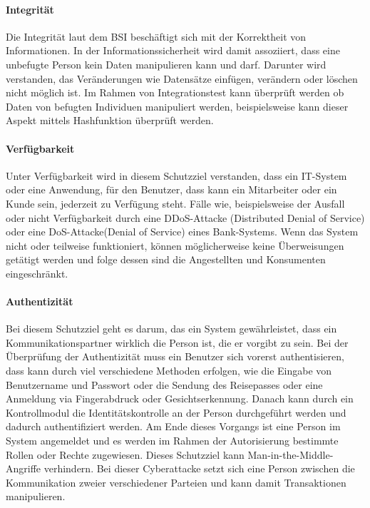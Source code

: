 \paragraph{Integrität}
Die Integrität laut dem BSI beschäftigt sich mit der Korrektheit von Informationen. In der Informationssicherheit wird damit assoziiert, dass eine unbefugte Person kein Daten manipulieren kann und darf. Darunter wird verstanden, das Veränderungen wie Datensätze einfügen, verändern oder löschen nicht möglich ist.
Im Rahmen von Integrationstest kann überprüft werden ob Daten von befugten Individuen manipuliert werden, beispielsweise kann dieser Aspekt mittels Hashfunktion überprüft werden.


\paragraph{Verfügbarkeit}
Unter Verfügbarkeit wird in diesem Schutzziel verstanden, dass ein IT-System oder eine Anwendung, für den Benutzer, dass kann ein Mitarbeiter oder ein Kunde sein, jederzeit zu Verfügung steht. Fälle wie, beispielsweise der Ausfall oder nicht Verfügbarkeit durch eine DDoS-Attacke  (Distributed Denial of Service) oder eine DoS-Attacke(Denial of Service) eines Bank-Systems. Wenn das System nicht oder teilweise funktioniert, können möglicherweise keine Überweisungen getätigt werden und folge dessen sind die Angestellten und Konsumenten eingeschränkt. 

\paragraph{Authentizität}
Bei diesem Schutzziel geht es darum, das ein System gewährleistet, dass ein Kommunikationspartner wirklich die Person ist, die er vorgibt zu sein. Bei der Überprüfung der Authentizität muss ein Benutzer sich vorerst authentisieren, dass kann durch viel verschiedene Methoden erfolgen, wie die Eingabe von Benutzername und Passwort oder die Sendung des Reisepasses oder eine Anmeldung via Fingerabdruck oder Gesichtserkennung. Danach kann durch ein Kontrollmodul die Identitätskontrolle an der Person durchgeführt werden und dadurch authentifiziert werden. Am Ende dieses Vorgangs ist eine Person im System angemeldet und es werden im Rahmen der Autorisierung bestimmte Rollen oder Rechte zugewiesen.
Dieses Schutzziel kann Man-in-the-Middle-Angriffe verhindern. Bei dieser Cyberattacke setzt sich eine Person zwischen die Kommunikation zweier verschiedener Parteien und kann damit Transaktionen manipulieren. 

